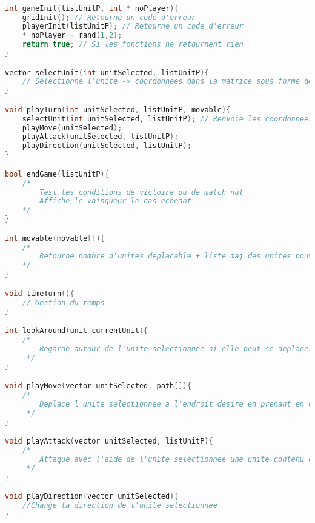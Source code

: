 \documentclass[a4paper,10pt]{extreport}
\begin{document}
\begin{lstlisting}[language=c]

int gameInit(listUnitP, int * noPlayer){
	gridInit(); // Retourne un code d'erreur
	playerInit(listUnitP); // Retourne un code d'erreur
	* noPlayer = rand(1,2);
	return true; // Si les fonctions ne retournent rien
}

vector selectUnit(int unitSelected, listUnitP){
	// Selectionne l'unite -> coordonnees dans la matrice sous forme de vecteur
}

void playTurn(int unitSelected, listUnitP, movable){
	selectUnit(int unitSelected, listUnitP); // Renvoie les coordonnees de l'unite selectionnee
	playMove(unitSelected);
	playAttack(unitSelected, listUnitP);
	playDirection(unitSelected, listUnitP);
}

bool endGame(listUnitP){
	/* 	
		Test les conditions de victoire ou de match nul
	 	Affiche le vainqueur le cas echeant
	*/
}

int movable(movable[]){
	/* 	
		Retourne nombre d'unites deplacable + liste maj des unites pouvant se deplacer
	*/
}

void timeTurn(){
	// Gestion du temps
}

int lookAround(unit currentUnit){
	/*
		Regarde autour de l'unite selectionnee si elle peut se deplacer sur une case si TP pas permise alors deplacement impossible
	 */
}

void playMove(vector unitSelected, path[]){
	/*
		Deplace l'unite selectionnee a l'endroit desire en prenant en compte les chemins possibles
	 */
}

void playAttack(vector unitSelected, listUnitP){
	/*
		Attaque avec l'aide de l'unite selectionnee une unite contenu dans la liste listUnitP
	 */
}

void playDirection(vector unitSelected){
	//Change la direction de l'unite selectionnee
}

\end{lstlisting}
\end{document}
